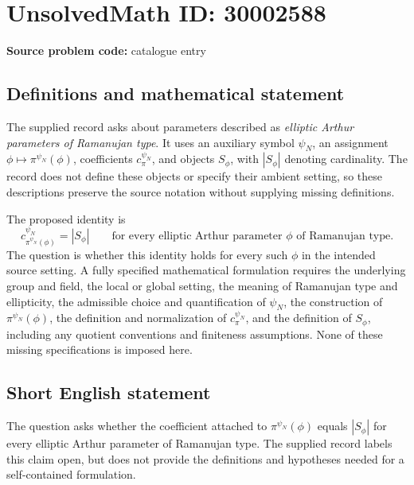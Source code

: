 \documentclass[11pt]{article}
\begin{document}
\section*{UnsolvedMath ID: 30002588}
\textbf{Source problem code:} catalogue entry
\subsection{Definitions and mathematical statement}
The supplied record asks about parameters described as \emph{elliptic Arthur parameters of Ramanujan type}. It uses an auxiliary symbol \(\psi_N\), an assignment \(\phi\mapsto\pi^{\psi_N}(\phi)\), coefficients \(c_{\pi}^{\psi_N}\), and objects \(S_\phi\), with \(|S_\phi|\) denoting cardinality. The record does not define these objects or specify their ambient setting, so these descriptions preserve the source notation without supplying missing definitions.

The proposed identity is
\[
 c_{\pi^{\psi_N}(\phi)}^{\psi_N}=|S_\phi|
 \qquad\text{for every elliptic Arthur parameter \(\phi\) of Ramanujan type.}
\]
The question is whether this identity holds for every such \(\phi\) in the intended source setting. A fully specified mathematical formulation requires the underlying group and field, the local or global setting, the meaning of Ramanujan type and ellipticity, the admissible choice and quantification of \(\psi_N\), the construction of \(\pi^{\psi_N}(\phi)\), the definition and normalization of \(c_{\pi}^{\psi_N}\), and the definition of \(S_\phi\), including any quotient conventions and finiteness assumptions. None of these missing specifications is imposed here.
\subsection{Short English statement}
The question asks whether the coefficient attached to \(\pi^{\psi_N}(\phi)\) equals \(|S_\phi|\) for every elliptic Arthur parameter of Ramanujan type. The supplied record labels this claim open, but does not provide the definitions and hypotheses needed for a self-contained formulation.
\end{document}
